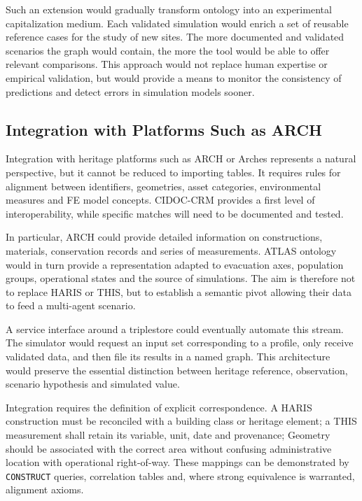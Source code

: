 \documentclass{article}
\begin{document}
Such an extension would gradually transform ontology into an experimental capitalization medium. Each validated simulation would enrich a set of reusable reference cases for the study of new sites. The more documented and validated scenarios the graph would contain, the more the tool would be able to offer relevant comparisons. This approach would not replace human expertise or empirical validation, but would provide a means to monitor the consistency of predictions and detect errors in simulation models sooner.

\subsection{Integration with Platforms Such as ARCH}

Integration with heritage platforms such as ARCH or Arches represents a natural perspective, but it cannot be reduced to importing tables. It requires rules for alignment between identifiers, geometries, asset categories, environmental measures and FE model concepts. CIDOC-CRM provides a first level of interoperability, while specific matches will need to be documented and tested.

In particular, ARCH could provide detailed information on constructions, materials, conservation records and series of measurements. ATLAS ontology would in turn provide a representation adapted to evacuation axes, population groups, operational states and the source of simulations. The aim is therefore not to replace HARIS or THIS, but to establish a semantic pivot allowing their data to feed a multi-agent scenario.

A service interface around a triplestore could eventually automate this stream. The simulator would request an input set corresponding to a profile, only receive validated data, and then file its results in a named graph. This architecture would preserve the essential distinction between heritage reference, observation, scenario hypothesis and simulated value.

Integration requires the definition of explicit correspondence. A HARIS construction must be reconciled with a building class or heritage element; a THIS measurement shall retain its variable, unit, date and provenance; Geometry should be associated with the correct area without confusing administrative location with operational right-of-way. These mappings can be demonstrated by \texttt{CONSTRUCT} queries, correlation tables and, where strong equivalence is warranted, alignment axioms.
\end{document}
